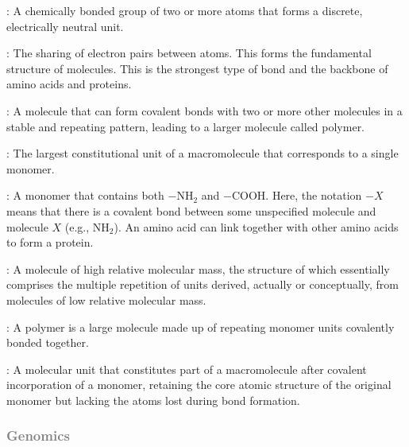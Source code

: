 \documentclass[a4paper,12pt]{extarticle}
\begin{document}
  \begin{description}[leftmargin=1.2em]
    \item[Molecule]: A chemically bonded group of two or more atoms that forms a discrete, electrically neutral unit.
    \item[Covalent Bond]: The sharing of electron pairs between atoms. This forms the fundamental structure of molecules. This is the strongest type of bond and the backbone of amino acids and proteins.
    \item[Monomer]: A molecule that can form covalent bonds with two or more other molecules in a stable and repeating pattern, leading to a larger molecule called polymer.
    \item[Monomeric Unit]: The largest constitutional unit of a macromolecule that corresponds to a single monomer.
    \item[Amino Acid]: A monomer that contains both \(-\text{NH}_2\) and \(-\text{COOH}\). Here, the notation \(-X\) means that there is a covalent bond between some unspecified molecule and molecule \(X\) (e.g., \(\text{NH}_2\)). An amino acid can link together with other amino acids to form a protein.
    \item[Macromolecule]: A molecule of high relative molecular mass, the structure of which essentially comprises the multiple repetition of units derived, actually or conceptually, from molecules of low relative molecular mass.
    \item[Polymer]: A polymer is a large molecule made up of repeating monomer units covalently bonded together.
    \item[Residue]: A molecular unit that constitutes part of a macromolecule after covalent incorporation of a monomer, retaining the core atomic structure of the original monomer but lacking the atoms lost during bond formation.
  \end{description}
  
  \subsubsection*{%
    \textcolor{gray}{Genomics}
  }
  
\end{document}
